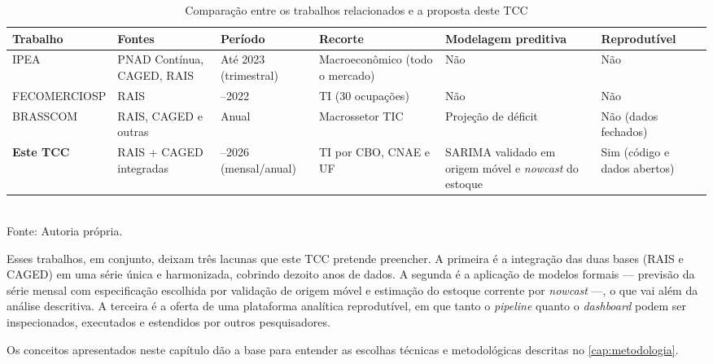 \begin{table}[htbp]
    \centering
    \caption{Comparação entre os trabalhos relacionados e a proposta deste TCC}
    \label{tab:comparativo-relacionados}
    \footnotesize
    \renewcommand{\arraystretch}{1.35}
    \begin{tabularx}{\textwidth}{%
        >{\raggedright\arraybackslash\hsize=1.20\hsize}X
        >{\raggedright\arraybackslash\hsize=1.00\hsize}X
        >{\raggedright\arraybackslash\hsize=0.90\hsize}X
        >{\raggedright\arraybackslash\hsize=1.10\hsize}X
        >{\raggedright\arraybackslash\hsize=1.00\hsize}X
        >{\raggedright\arraybackslash\hsize=0.80\hsize}X}
        \toprule
        \rowcolor{black!8}
        \textbf{Trabalho} & \textbf{Fontes} & \textbf{Período} & \textbf{Recorte} & \textbf{Modelagem preditiva} & \textbf{Reprodu\-tível} \\
        \midrule
        IPEA            & PNAD Contínua, CAGED, RAIS  & Até 2023 (trimestral) & Macroeconômico (todo o mercado) & Não & Não \\
        FECOMERCIOSP & RAIS                     & 2012--2022 & TI (30 ocupações) & Não & Não \\
        BRASSCOM & RAIS, CAGED e outras & Anual & Macrossetor TIC & Projeção de déficit & Não (dados fechados) \\
        \rowcolor{blue!6}
        \textbf{Este TCC}               & RAIS + CAGED integradas & 2007--2026 (mensal/anual) & TI por CBO, CNAE e UF & SARIMA validado em origem móvel e \textit{nowcast} do estoque & Sim (código e dados abertos) \\
        \bottomrule
    \end{tabularx}
    \\[4pt]
    Fonte: Autoria própria.
\end{table}

Esses trabalhos, em conjunto, deixam três lacunas que este TCC pretende preencher. A primeira é a integração das duas bases (RAIS e CAGED) em uma série única e harmonizada, cobrindo dezoito anos de dados. A segunda é a aplicação de modelos formais --- previsão da série mensal com especificação escolhida por validação de origem móvel e estimação do estoque corrente por \textit{nowcast} ---, o que vai além da análise descritiva. A terceira é a oferta de uma plataforma analítica reprodutível, em que tanto o \textit{pipeline} quanto o \textit{dashboard} podem ser inspecionados, executados e estendidos por outros pesquisadores.

Os conceitos apresentados neste capítulo dão a base para entender as escolhas técnicas e metodológicas descritas no \autoref{cap:metodologia}.
